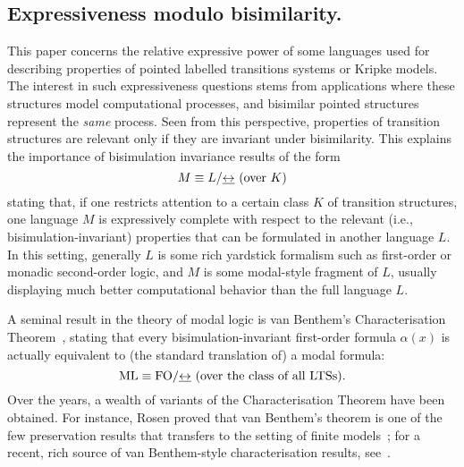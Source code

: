 

\subsection{Expressiveness modulo bisimilarity.}
%
This paper concerns the relative expressive power of some languages used for
describing properties of pointed labelled transitions systems or Kripke
models.
The interest in such expressiveness questions stems from applications where
these structures model computational processes, and bisimilar pointed
structures represent the \emph{same} process.
Seen from this perspective, properties of transition structures are relevant
only if they are invariant under bisimilarity.
This explains the importance of bisimulation invariance results of the form
\begin{equation}
\label{eq:1}
M \equiv L / {\bis} \text{ (over $K$)}
\end{equation}
stating that,  if one restricts attention to a certain class $K$ of transition
structures, one language $M$ is expressively complete with respect to the
relevant (i.e., bisimulation-invariant) properties that can be formulated in
another language $L$.
In this setting, generally $L$ is some rich yardstick formalism such as
first-order or monadic second-order logic, and $M$ is some modal-style
fragment of $L$, usually displaying much better computational behavior
than the full language $L$.

A seminal result in the theory of modal logic is van Benthem's Characterisation
Theorem~\cite{vanBenthemPhD}, stating that every bisimulation-invariant
first-order formula $\alpha(x)$ is actually equivalent to (the standard
translation of) a modal formula:
\begin{equation*}
\ML \equiv \fo/{\bis} \text{ (over the class of all LTSs)}.
\end{equation*}
Over the years, a wealth of variants of the Characterisation Theorem have been
obtained.
For instance, Rosen proved that van Benthem's theorem is one of the few
preservation results that transfers to the setting of finite
models~\cite{rose:moda97}; for a recent, rich source of van Benthem-style
characterisation results, see~\cite{DawarO09}.

